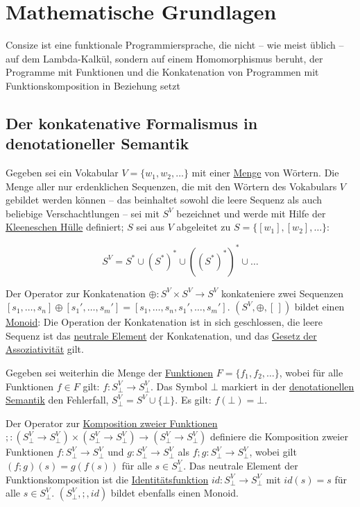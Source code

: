 \chapter{Mathematische Grundlagen}

Consize ist eine funktionale Programmiersprache, die nicht -- wie meist üblich -- auf dem Lambda-Kalkül, sondern auf einem Homomorphismus beruht, der Programme mit Funktionen und die Konkatenation von Programmen mit Funktionskomposition in Beziehung setzt

\section{Der konkatenative Formalismus in denotationeller Semantik}

Gegeben sei ein Vokabular $V=\{w_1, w_2, \dots\}$ mit einer \href{http://de.wikipedia.org/wiki/Menge\_(Mathematik)}{Menge} von Wör\-tern. Die Menge aller nur erdenklichen Sequenzen, die mit den Wörtern des Vokabulars $V$ gebildet werden können -- das beinhaltet sowohl die leere Sequenz als auch beliebige Verschachtlungen -- sei mit $S^V$ bezeichnet und werde mit Hilfe der \href{http://de.wikipedia.org/wiki/Kleenesche_und_positive_H\%C3\%BClle}{Kleeneschen Hülle} definiert; $S$ sei aus $V$ abgeleitet zu $S=\{[w_1],[w_2],\dots\}$:

$$S^V=S^{\ast}\cup(S^{\ast})^{\ast}\cup((S^{\ast})^{\ast})^{\ast}\cup\dots$$

Der Operator zur Konkatenation $\oplus: S^V\times S^V \rightarrow S^V$ konkateniere zwei Sequenzen
$[s_1,\dots,s_n]\oplus[s_1',\dots,s_m']=[s_1,\dots,s_n,s_1',\dots,s_m']$. $(S^V,\oplus,[\,])$ bildet einen \href{http://de.wikipedia.org/wiki/Monoid}{Monoid}: Die Operation der Konkatenation ist in sich geschlossen, die leere Sequenz ist das \href{http://de.wikipedia.org/wiki/Neutrales\_Element}{neutrale Element} der Konkatenation, und das \href{http://de.wikipedia.org/wiki/Assoziativgesetz}{Gesetz der Assoziativität} gilt.

Gegeben sei weiterhin die Menge der \href{http://de.wikipedia.org/wiki/Funktion\_(Mathematik)}{Funktionen} $F=\{f_1, f_2, \dots\}$, wobei für alle Funktionen $f\in F$ gilt: $f:S^V_{\bot}\rightarrow S^V_{\bot}$. Das Symbol $\bot$ markiert in der \href{http://de.wikipedia.org/wiki/Denotationelle\_Semantik}{denotationellen Semantik} den Fehlerfall, $S^V_{\bot}=S^V\cup\{\bot\}$. Es gilt: $f(\bot)=\bot$.

Der Operator zur \href{http://de.wikipedia.org/wiki/Komposition\_(Mathematik)}{Komposition zweier Funktionen}
$;:(S^V_{\bot}\rightarrow S^V_{\bot}) \times
(S^V_{\bot}\rightarrow S^V_{\bot}) \rightarrow
(S^V_{\bot}\rightarrow S^V_{\bot})$ definiere die Komposition zweier Funktionen 
$f:S^V_{\bot}\rightarrow S^V_{\bot}$
und 
$g:S^V_{\bot}\rightarrow S^V_{\bot}$
als $f;g: S^V_{\bot}\rightarrow S^V_{\bot}$, wobei gilt
$(f;g)(s)=g(f(s))$ für alle $s\in S^V_{\bot}$. Das neutrale Element der Funktionskomposition ist die \href{http://de.wikipedia.org/wiki/Identische\_Abbildung}{Identitätsfunktion} $id:S^V_{\bot}\rightarrow S^V_{\bot}$ mit $id(s)=s$ für alle $s\in S^V_{\bot}$. $(S^V_{\bot},;,id)$ bildet ebenfalls einen Monoid.

